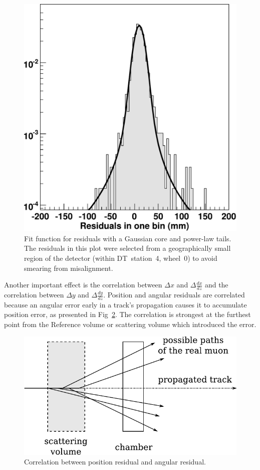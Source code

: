 \documentclass[12pt]{article}
\begin{document}
\begin{figure}
\begin{center} \includegraphics[width=0.4\linewidth]{fitfunction.pdf} \end{center}
\caption{Fit function for residuals with a Gaussian core and power-law tails.  The residuals in this plot were selected from a geographically small region of the detector (within DT~station~4, wheel~0) to avoid smearing from misalignment. \label{fig:fitfunction}}
\end{figure}

Another important effect is the correlation between $\Delta x$ and
$\Delta \frac{dx}{dz}$ and the correlation between $\Delta y$ and
$\Delta \frac{dy}{dz}$.  Position and angular residuals are correlated
because an angular error early in a track's propagation causes it to
accumulate position error, as presented in
Fig~\ref{fig:sawtooth_diagram}.  The correlation is strongest at the
furthest point from the Reference volume or scattering volume which
introduced the error.

\begin{figure}
\begin{center} \includegraphics[height=4.5 cm]{sawtooth_diagram.pdf} \end{center}
\caption{Correlation between position residual and angular residual. \label{fig:sawtooth_diagram}}
\end{figure}
\end{document}
